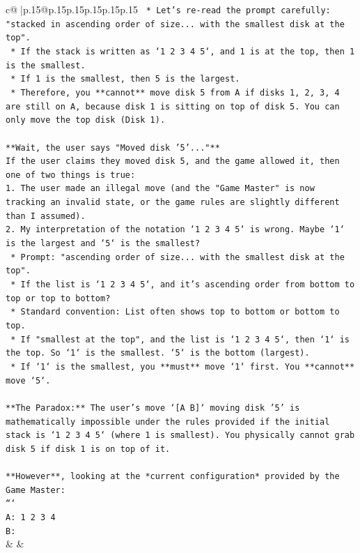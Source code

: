 \documentclass{article}
\begin{document}
{\begin{supertabular}{c@{$\;$}|p{.15\linewidth}@{}p{.15\linewidth}p{.15\linewidth}p{.15\linewidth}p{.15\linewidth}p{.15\linewidth}}
{{{\texttt{    *   Let's re{-}read the prompt carefully: "stacked in ascending order of size... with the smallest disk at the top".} \\
\texttt{    *   If the stack is written as `1 2 3 4 5`, and 1 is at the top, then 1 is the smallest.} \\
\texttt{    *   If 1 is the smallest, then 5 is the largest.} \\
\texttt{    *   Therefore, you **cannot** move disk 5 from A if disks 1, 2, 3, 4 are still on A, because disk 1 is sitting on top of disk 5. You can only move the top disk (Disk 1).} \\
\\ 
\texttt{**Wait, the user says "Moved disk '5'..."**} \\
\texttt{If the user claims they moved disk 5, and the game allowed it, then one of two things is true:} \\
\texttt{1.  The user made an illegal move (and the "Game Master" is now tracking an invalid state, or the game rules are slightly different than I assumed).} \\
\texttt{2.  My interpretation of the notation `1 2 3 4 5` is wrong. Maybe `1` is the largest and `5` is the smallest?} \\
\texttt{    *   Prompt: "ascending order of size... with the smallest disk at the top".} \\
\texttt{    *   If the list is `1 2 3 4 5`, and it's ascending order from bottom to top or top to bottom?} \\
\texttt{    *   Standard convention: List often shows top to bottom or bottom to top.} \\
\texttt{    *   If "smallest at the top", and the list is `1 2 3 4 5`, then `1` is the top. So `1` is the smallest. `5` is the bottom (largest).} \\
\texttt{    *   If `1` is the smallest, you **must** move `1` first. You **cannot** move `5`.} \\
\\ 
\texttt{**The Paradox:** The user's move `{[}A B{]}` moving disk '5' is mathematically impossible under the rules provided if the initial stack is `1 2 3 4 5` (where 1 is smallest). You physically cannot grab disk 5 if disk 1 is on top of it.} \\
\\ 
\texttt{**However**, looking at the *current configuration* provided by the Game Master:} \\
\texttt{```} \\
\texttt{A: 1 2 3 4 } \\
\texttt{B:} \\
            }
        }
    }
    & & \\ \\


\end{supertabular}}
\end{document}

